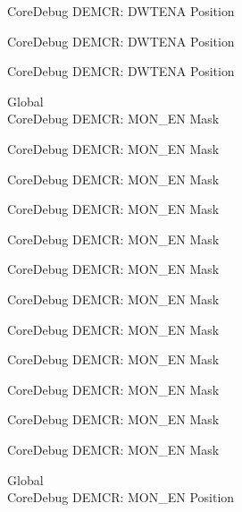 \begin{DoxyRefList}
\label{deprecated__deprecated000272}%
%
Core\+Debug DEMCR\+: DWTENA Position 

\label{deprecated__deprecated000811}%
%
Core\+Debug DEMCR\+: DWTENA Position 

\label{deprecated__deprecated000950}%
%
Core\+Debug DEMCR\+: DWTENA Position  
\item[Global \doxylink{group___c_m_s_i_s___core_debug_gac2b46b9b65bf8d23027f255fc9641977}{Core\+Debug\+\_\+\+DEMCR\+\_\+\+MON\+\_\+\+EN\+\_\+\+Msk} ]\hfill \\
\label{deprecated__deprecated000054}%
%
Core\+Debug DEMCR\+: MON\+\_\+\+EN Mask 

\label{deprecated__deprecated000198}%
%
Core\+Debug DEMCR\+: MON\+\_\+\+EN Mask 

\label{deprecated__deprecated000340}%
%
Core\+Debug DEMCR\+: MON\+\_\+\+EN Mask 

\label{deprecated__deprecated000416}%
%
Core\+Debug DEMCR\+: MON\+\_\+\+EN Mask 

\label{deprecated__deprecated000505}%
%
Core\+Debug DEMCR\+: MON\+\_\+\+EN Mask 

\label{deprecated__deprecated000607}%
%
Core\+Debug DEMCR\+: MON\+\_\+\+EN Mask 

\label{deprecated__deprecated000732}%
%
Core\+Debug DEMCR\+: MON\+\_\+\+EN Mask 

\label{deprecated__deprecated000876}%
%
Core\+Debug DEMCR\+: MON\+\_\+\+EN Mask 

\label{deprecated__deprecated001018}%
%
Core\+Debug DEMCR\+: MON\+\_\+\+EN Mask 

\label{deprecated__deprecated001094}%
%
Core\+Debug DEMCR\+: MON\+\_\+\+EN Mask 

\label{deprecated__deprecated001183}%
%
Core\+Debug DEMCR\+: MON\+\_\+\+EN Mask 

\label{deprecated__deprecated001285}%
%
Core\+Debug DEMCR\+: MON\+\_\+\+EN Mask  
\item[Global \doxylink{group___c_m_s_i_s___core_debug_ga802829678f6871863ae9ecf60a10425c}{Core\+Debug\+\_\+\+DEMCR\+\_\+\+MON\+\_\+\+EN\+\_\+\+Pos} ]\hfill \\
\label{deprecated__deprecated000053}%
%
Core\+Debug DEMCR\+: MON\+\_\+\+EN Position 


\end{DoxyRefList}

